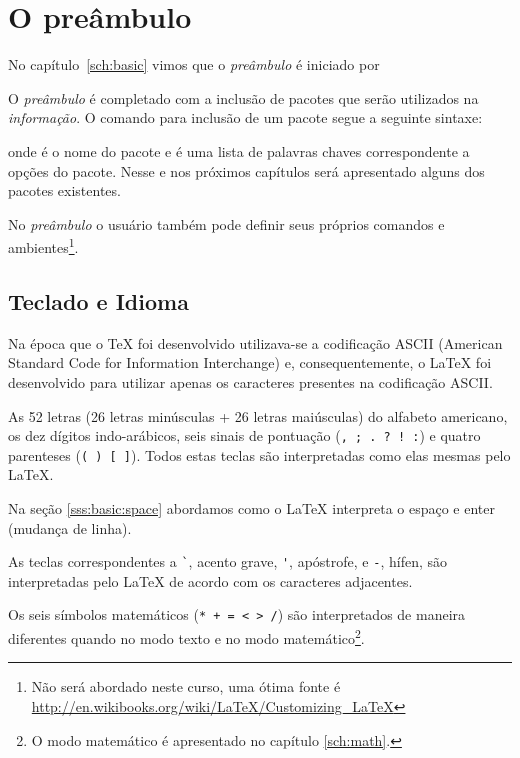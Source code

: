\chapter{O preâmbulo}
No capítulo~\ref{sch:basic} vimos que o \emph{preâmbulo} é iniciado por

O \emph{preâmbulo} é completado com a inclusão
de pacotes que serão utilizados na \emph{informação}. O comando para inclusão de
um pacote segue a seguinte
sintaxe:
\begin{code}
  \usepackage[opcoes]{pacote}
\end{code}
onde  é o nome do pacote e  é uma lista de
palavras chaves correspondente a opções do pacote. Nesse e nos próximos
capítulos será apresentado alguns dos pacotes existentes.

No \emph{preâmbulo} o usuário também pode definir seus
próprios comandos e ambientes\footnote{Não será abordado neste curso, uma ótima
fonte é \url{http://en.wikibooks.org/wiki/LaTeX/Customizing_LaTeX}}.

\section{Teclado e Idioma}
Na época que o TeX foi desenvolvido utilizava-se a codificação ASCII (American
Standard Code for Information Interchange) e, consequentemente, o LaTeX foi
desenvolvido para utilizar apenas os caracteres presentes na codificação ASCII.

As 52 letras (26 letras minúsculas + 26 letras maiúsculas) do alfabeto
americano, os dez dígitos indo-arábicos, seis sinais de pontuação
(\lstinline+, ; . ? ! :+) e quatro parenteses (\lstinline!( ) [ ]!). Todos estas
teclas são interpretadas como elas mesmas pelo LaTeX.

Na seção \ref{sss:basic:space} abordamos como o LaTeX interpreta o espaço e
enter (mudança de linha).

As teclas correspondentes a \lstinline!`!, acento grave, \lstinline!'!,
apóstrofe, e \lstinline!-!, hífen, são interpretadas pelo LaTeX de acordo com os
caracteres adjacentes.

Os seis símbolos matemáticos (\lstinline!* + = < > /!) são interpretados de
maneira diferentes quando no modo texto e no modo matemático\footnote{O modo
matemático é apresentado no capítulo \ref{sch:math}.}.

